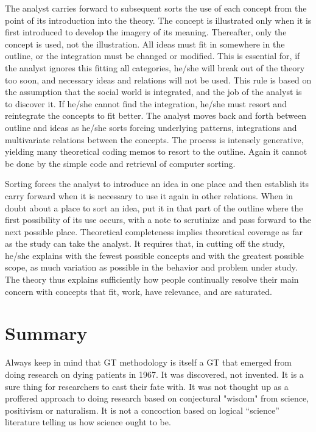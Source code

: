 The analyst carries forward to subsequent sorts the use of each concept from the point of its introduction into the theory. 
The concept is illustrated only when it is first introduced to develop the imagery of its meaning. 
Thereafter, only the concept is used, not the illustration. 
All ideas must fit in somewhere in the outline, or the integration must be changed or modified. 
This is essential for, 
if the analyst ignores this fitting all categories, 
he/she will break out of the theory too soon, and necessary ideas and relations will not be used. 
This rule is based on the assumption that the social world is integrated, and the job of the analyst is to discover it. 
If he/she cannot find the integration, he/she must resort and reintegrate the concepts to fit better. 
The analyst moves back and forth between outline and ideas as he/she sorts forcing underlying patterns, 
integrations and multivariate relations between the concepts. 
The process is intensely generative,
yielding many theoretical coding memos to resort to the outline. 
Again it cannot be done by the simple code and retrieval of computer sorting.


Sorting forces the analyst to introduce an idea in one place and then establish its carry forward when it is necessary to use it again in other relations. 
When in doubt about a place to sort an idea, 
put it in that part of the outline where the first possibility of its use occurs,
with a note to scrutinize and pass forward to the next possible place. 
Theoretical completeness implies theoretical coverage as far as the study can take the analyst. 
It requires that, in cutting off the study,
he/she explains with the fewest possible concepts and with the greatest possible scope, 
as much variation as possible in the behavior and problem under study.
The theory thus explains sufficiently how people continually resolve their main concern with concepts that fit, 
work,  have relevance, and are saturated.

\section*{Summary}

Always keep in mind that GT methodology is itself a GT that emerged from doing research on dying patients in 1967. 
It was discovered, not invented. 
It is a sure thing for researchers to cast their fate with. 
It was not thought up as a proffered approach to doing research based on conjectural "wisdom" from science, 
positivism or naturalism. 
It is not a concoction based on logical “science” literature telling us how science ought to be.

